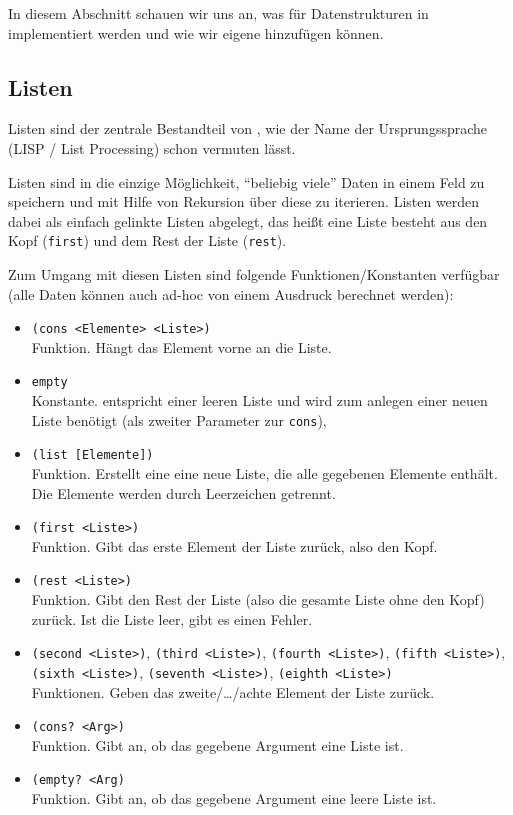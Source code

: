 
In diesem Abschnitt schauen wir uns an, was für Datenstrukturen in \racketText implementiert werden und wie wir eigene hinzufügen können.

\subsection{Listen}
	Listen sind der zentrale Bestandteil von \racketText, wie der Name der Ursprungssprache (LISP / List Processing) schon vermuten lässt.
	
	Listen sind in \racketText die einzige Möglichkeit, \enquote{beliebig viele} Daten in einem Feld zu speichern und mit Hilfe von Rekursion über diese zu iterieren. Listen werden dabei als einfach gelinkte Listen abgelegt, das heißt eine Liste besteht aus den Kopf (\texttt{first}) und dem Rest der Liste (\texttt{rest}).
	
	Zum Umgang mit diesen Listen sind folgende Funktionen/Konstanten verfügbar (alle Daten können auch ad-hoc von einem Ausdruck berechnet werden):
	\begin{itemize}
		\item \lstinline[language = Racket]|(cons <Elemente> <Liste>)| \\ Funktion. Hängt das Element vorne an die Liste.
		\item \lstinline[language = Racket]|empty| \\ Konstante. entspricht einer leeren Liste und wird zum anlegen einer neuen Liste benötigt (als zweiter Parameter zur \texttt{cons}),
		\item \lstinline[language = Racket]|(list [Elemente])| \\ Funktion. Erstellt eine eine neue Liste, die alle gegebenen Elemente enthält. Die Elemente werden durch Leerzeichen getrennt.
		\item \lstinline[language = Racket]|(first <Liste>)| \\ Funktion. Gibt das erste Element der Liste zurück, also den Kopf.
		\item \lstinline[language = Racket]|(rest <Liste>)| \\ Funktion. Gibt den Rest der Liste (also die gesamte Liste ohne den Kopf) zurück. Ist die Liste leer, gibt es einen Fehler.
		\item \lstinline[language = Racket]|(second <Liste>)|, \lstinline[language = Racket]|(third <Liste>)|, \lstinline[language = Racket]|(fourth <Liste>)|, \lstinline[language = Racket]|(fifth <Liste>)|, \lstinline[language = Racket]|(sixth <Liste>)|, \lstinline[language = Racket]|(seventh <Liste>)|, \lstinline[language = Racket]|(eighth <Liste>)| \\ Funktionen. Geben das zweite/\dots/achte Element der Liste zurück.
		\item \lstinline[language = Racket]|(cons? <Arg>)| \\ Funktion. Gibt an, ob das gegebene Argument eine Liste ist.
		\item \lstinline[language = Racket]|(empty? <Arg)| \\ Funktion. Gibt an, ob das gegebene Argument eine leere Liste ist.
	\end{itemize}

